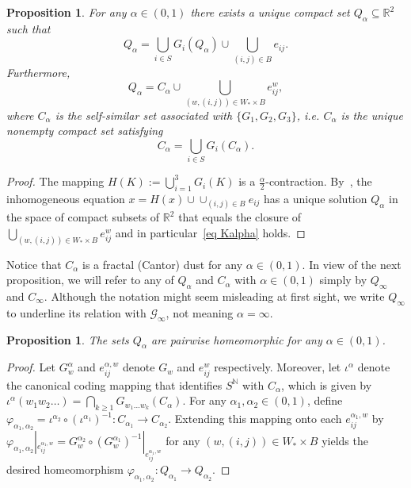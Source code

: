 \documentclass[11pt]{amsart}
\newtheorem{proposition}[theorem]{Proposition}
\theoremstyle{definition}
\theoremstyle{remark}
\theoremstyle{example}
\numberwithin{equation}{section}
\begin{document}
\begin{proposition}\label{prop existence Qalpha}
For any $\alpha\in (0,1)$ there exists a unique compact set $Q_{\alpha}\subseteq{{\mathbb R}}^2$ such that
\[
Q_{\alpha} = \bigcup_{i\in S}G_i(Q_{\alpha}) \cup \bigcup_{(i,j)\in B} e_{ij}.
\]
Furthermore,
\begin{equation}\label{eq decomp Qalpha}
Q_{\alpha} = C_{\alpha} \cup \bigcup_{(w,(i,j)) \in W_*\times B}e_{ij}^w,
\end{equation}
where $C_{\alpha}$ is the self-similar set associated with $\{G_1, G_2, G_3\}$, i.e. $C_{\alpha}$ is the unique nonempty compact set satisfying
\begin{equation}\label{eq Kalpha}
C_\alpha = \bigcup_{i\in S}G_i(C_\alpha).
\end{equation}
\end{proposition}
\begin{proof}
The mapping $H(K):=\bigcup_{i=1}^3 G_i(K)$ is a $\frac{\alpha}{2}$-contraction. By~\cite[Theorem 1]{Hat85}, the inhomogeneous equation 
$x=H(x)\cup \cup_{(i,j)\in B} e_{ij}$ has a unique solution $Q_\alpha$ in the space of compact subsets of ${{\mathbb R}}^2$ that equals the closure of 
$\bigcup_{(w,(i,j)) \in W_*\times B}e_{ij}^w$ and in particular~\eqref{eq Kalpha} holds.
\end{proof}
Notice that 
$C_\alpha$ is a fractal (Cantor) dust for any $\alpha\in(0,1)$. In view of the next proposition, we will refer to any of $Q_\alpha$ and $C_\alpha$ with $\alpha\in(0,1)$ simply by $Q_\infty$ and $C_\infty$. Although the notation might seem misleading at first sight, we write $Q_\infty$ to underline its relation with ${\mathcal{G}}_\infty$, not meaning $\alpha=\infty$.
\begin{proposition}\label{prop Qalpha homeo}
The sets $Q_\alpha$ are pairwise homeomorphic for any $\alpha\in (0,1)$.
\end{proposition}
\begin{proof}
Let $G_w^{\alpha}$ and $e^{\alpha,w}_{ij}$ denote $G_w$ and $e^w_{ij}$ respectively. Moreover, let $\iota^\alpha$ denote the canonical coding mapping that identifies $S^{{\mathbb N}}$ with $C_\alpha$, which is given by $\iota^\alpha(w_1w_2\ldots)=\bigcap_{k\geq 1}G_{w_1\ldots w_k}(C_\alpha)$. For any $\alpha_1,\alpha_2\in (0,1)$, define $\varphi_{\alpha_1,\alpha_2}=\iota^{\alpha_2}{\circ}(\iota^{\alpha_1})^{-1}\colon C_{\alpha_1}\to C_{\alpha_2}$. Extending this mapping onto each $e^{\alpha_1,w}_{ij}$ by $\varphi_{\alpha_1,\alpha_2}|_{e^{\alpha_1,w}_{ij}}=G_w^{\alpha_2}{\circ}(G_w^{\alpha_1})^{-1}|_{e^{\alpha_1,w}_{ij}}$ for any $(w,(i,j))\in W_*\times B$ yields the desired homeomorphism $\varphi_{\alpha_1,\alpha_2}\colon Q_{\alpha_1}\to Q_{\alpha_2}$.
\end{proof}
\end{document}
